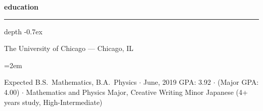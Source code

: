 \documentclass[12pt]{scrartcl}
\newcommand{\Description}[1]{\hangindent=2em\hangafter=0\noindent\raggedright\footnotesize{#1}\par\normalsize\vspace{0.5em}} %
\def\vhrulefill{\leavevmode\leaders\hrule height 0.7ex depth \dimexpr0.4pt-0.7ex\hfill\kern0pt}
\begin{document}
\date{}

\thispagestyle{empty} %



\begin{cv}{}\vspace{1.5em} %


\noindent
\begin{minipage}[t]{.6\textwidth}

\noindent\textbf{education} \hspace{1ex} \vhrulefill \vspace{0.5em} 

{\footnotesize\noindent
The University of Chicago --- Chicago, IL}

\Description{Expected B.S.\ Mathematics, B.A.\ Physics $\cdotp$ June, 2019\newline
GPA: 3.92 $\cdotp$ (Major GPA: 4.00) $\cdotp$ Mathematics and Physics Major, Creative Writing Minor\newline
Japanese (4+ years study, High-Intermediate)
}



\end{minipage}\hspace{1em}%
\begin{minipage}[t]{.35\textwidth}



\end{minipage}
\end{cv}
\end{document}
